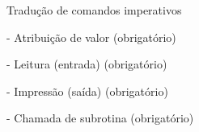 
Tradução de comandos imperativos

- Atribuição de valor (obrigatório)

- Leitura (entrada) (obrigatório)

- Impressão (saída) (obrigatório)

- Chamada de subrotina (obrigatório)
